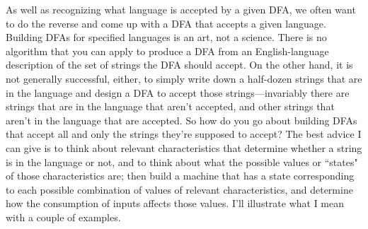 As well as recognizing what language is accepted by a given DFA, we often want to
do the reverse and come up with a DFA that accepts a given language.
Building DFAs for specified languages is an art, not a science.
There is no algorithm that you can apply to produce a DFA from an English-language
description of the set of strings the DFA should accept.  On the other hand, it
is not generally successful, either, to simply write down a half-dozen strings
that are in the language and design a DFA to accept those strings---invariably
there are strings that are in the language that aren't accepted, and other
strings that aren't in the language that are accepted.  So how do you go about
building DFAs that accept all and only the strings they're supposed to accept?
The best advice I can give is to
think about relevant characteristics that determine whether a string is in the
language or not, and to think about what the possible values or ``states" of 
those characteristics
are; then build a machine that has a state corresponding to each possible
combination of values of relevant characteristics, and determine how the
consumption of inputs affects those values.  I'll illustrate what I mean with a
couple of examples.
